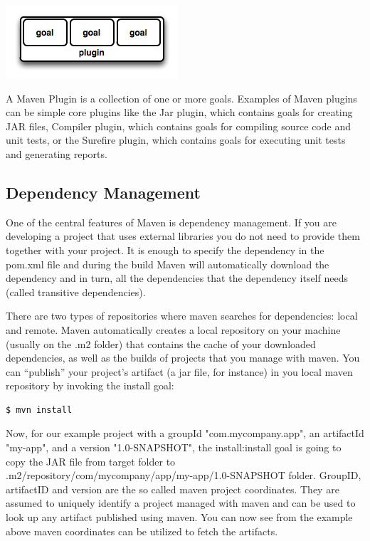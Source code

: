 \documentclass{article}
\begin{document}
\begin{center}
\includegraphics[scale=0.7]{figures/5}
\end{center}

A Maven Plugin is a collection of one or more goals. Examples of Maven
plugins can be simple core plugins like the Jar plugin, which contains
goals for creating JAR files, Compiler plugin, which contains goals
for compiling source code and unit tests, or the Surefire plugin,
which contains goals for executing unit tests and generating
reports.

\subsection{Dependency Management}

One of the central features of Maven is dependency management. If you
are developing a project that uses external libraries you do not need to
provide them together with your project. It is enough to specify the
dependency in the pom.xml file and during the build Maven will
automatically download the dependency and in turn, all the
dependencies that the dependency itself needs (called transitive
dependencies).

There are two types of repositories where maven searches for
dependencies: local and remote. Maven automatically creates a local
repository on your machine (usually on the .m2 folder) that contains
the cache of your downloaded dependencies, as well as the
builds of projects that you manage with maven. You can ``publish''
your project's artifact (a jar file, for instance) in you local maven
repository by invoking the install goal:

\begin{lstlisting}
$ mvn install
\end{lstlisting}

Now, for our example project with a groupId "com.mycompany.app", an
artifactId  "my-app", and a version "1.0-SNAPSHOT", the
install:install goal is going to copy the JAR file from
target folder to 
.m2/repository/com/mycompany/app/my-app/1.0-SNAPSHOT folder.
GroupID, artifactID and version are the so called maven project
coordinates. They are assumed to uniquely identify a project managed
with maven and can be used to look up any artifact published using
maven. You can now see from the example above maven coordinates can be
utilized to fetch the artifacts.
\end{document}
